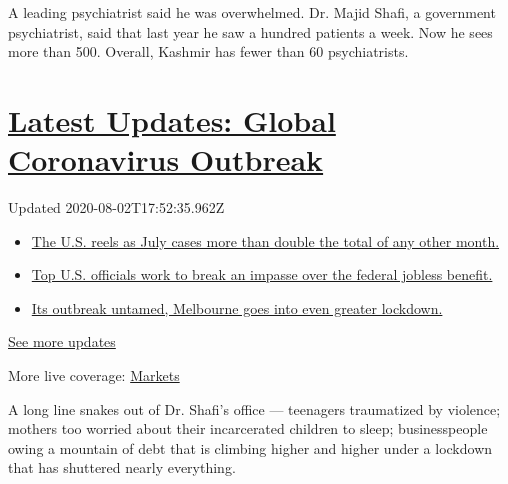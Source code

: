A leading psychiatrist said he was overwhelmed. Dr. Majid Shafi, a
government psychiatrist, said that last year he saw a hundred patients a
week. Now he sees more than 500. Overall, Kashmir has fewer than 60
psychiatrists.

\hypertarget{latest-updates-global-coronavirus-outbreak}{%
\section{\texorpdfstring{\href{https://www.nytimes.com/2020/08/01/world/coronavirus-covid-19.html?action=click\&pgtype=Article\&state=default\&region=MAIN_CONTENT_1\&context=storylines_live_updates}{Latest
Updates: Global Coronavirus
Outbreak}}{Latest Updates: Global Coronavirus Outbreak}}\label{latest-updates-global-coronavirus-outbreak}}

Updated 2020-08-02T17:52:35.962Z

\begin{itemize}
\tightlist
\item
  \href{https://www.nytimes.com/2020/08/01/world/coronavirus-covid-19.html?action=click\&pgtype=Article\&state=default\&region=MAIN_CONTENT_1\&context=storylines_live_updates\#link-34047410}{The
  U.S. reels as July cases more than double the total of any other
  month.}
\item
  \href{https://www.nytimes.com/2020/08/01/world/coronavirus-covid-19.html?action=click\&pgtype=Article\&state=default\&region=MAIN_CONTENT_1\&context=storylines_live_updates\#link-780ec966}{Top
  U.S. officials work to break an impasse over the federal jobless
  benefit.}
\item
  \href{https://www.nytimes.com/2020/08/01/world/coronavirus-covid-19.html?action=click\&pgtype=Article\&state=default\&region=MAIN_CONTENT_1\&context=storylines_live_updates\#link-2bc8948}{Its
  outbreak untamed, Melbourne goes into even greater lockdown.}
\end{itemize}

\href{https://www.nytimes.com/2020/08/01/world/coronavirus-covid-19.html?action=click\&pgtype=Article\&state=default\&region=MAIN_CONTENT_1\&context=storylines_live_updates}{See
more updates}

More live coverage:
\href{https://www.nytimes.com/live/2020/07/31/business/stock-market-today-coronavirus?action=click\&pgtype=Article\&state=default\&region=MAIN_CONTENT_1\&context=storylines_live_updates}{Markets}

A long line snakes out of Dr. Shafi's office --- teenagers traumatized
by violence; mothers too worried about their incarcerated children to
sleep; businesspeople owing a mountain of debt that is climbing higher
and higher under a lockdown that has shuttered nearly everything.

